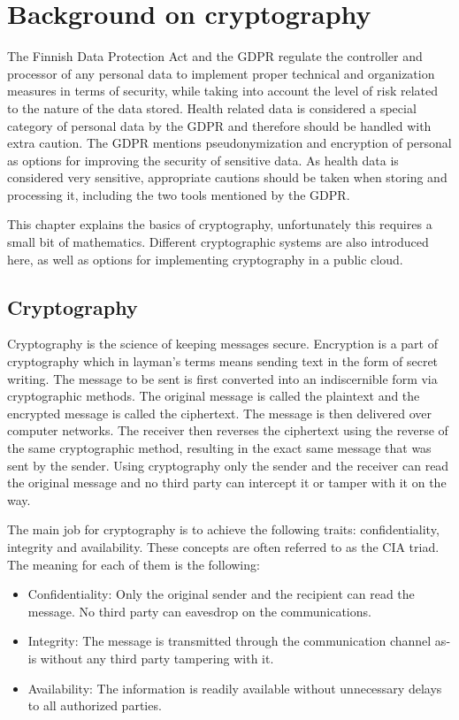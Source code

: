 \chapter{Background on cryptography} \label{cryptography background}

The Finnish Data Protection Act and the GDPR regulate the controller and processor of any personal data to implement proper technical and organization measures in terms of security, while taking into account the level of risk related to the nature of the data stored.
Health related data is considered a special category of personal data by the GDPR and therefore should be handled with extra caution.
The GDPR mentions pseudonymization and encryption of personal as options for improving the security of sensitive data.
As health data is considered very sensitive, appropriate cautions should be taken when storing and processing it, including the two tools mentioned by the GDPR.
\cite{gdpr}

This chapter explains the basics of cryptography, unfortunately this requires a small bit of mathematics.
Different cryptographic systems are also introduced here, as well as options for implementing cryptography in a public cloud.

\section{Cryptography}

Cryptography is the science of keeping messages secure.
Encryption is a part of cryptography which in layman's terms means sending text in the form of secret writing.
The message to be sent is first converted into an indiscernible form via cryptographic methods.
The original message is called the plaintext and the encrypted message is called the ciphertext.
The message is then delivered over computer networks.
The receiver then reverses the ciphertext using the reverse of the same cryptographic method, resulting in the exact same message that was sent by the sender.
Using cryptography only the sender and the receiver can read the original message and no third party can intercept it or tamper with it on the way.
\cite{applied-crypto}

The main job for cryptography is to achieve the following traits: confidentiality, integrity and availability.
These concepts are often referred to as the CIA triad.
The meaning for each of them is the following: \cite{crypto-principles}
\begin{itemize}
    \item Confidentiality: Only the original sender and the recipient can read the message.
    No third party can eavesdrop on the communications.
    \item Integrity: The message is transmitted through the communication channel as-is without any third party tampering with it.
    \item Availability: The information is readily available without unnecessary delays to all authorized parties.
\end{itemize}


